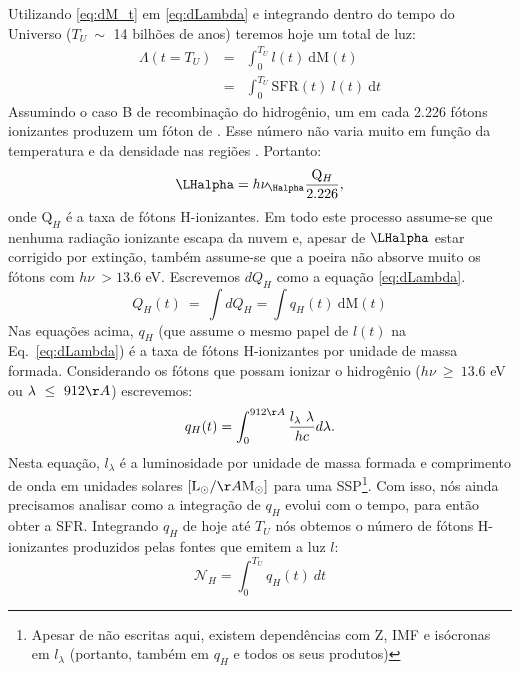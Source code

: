 Utilizando \eqref{eq:dM_t} em \eqref{eq:dLambda} e integrando dentro do tempo do Universo ($T_U\
\sim$ 14 bilhões de anos) teremos hoje um total de luz:
\begin{eqnarray}
	\Lambda(t = T_U) &=& \int_0^{T_U} l(t)\ \textrm{d}\textrm{M}(t) \\
	&=& \int_0^{T_U} \mathrm{SFR}(t)\ l(t)\ \textrm{d}t
	\label{eq:Lambda}
\end{eqnarray}
\noindent Assumindo o caso B de recombinação do hidrogênio, um em cada 2.226 fótons
ionizantes produzem um fóton de \Halpha \citep{Osterbrock.Ferland.2006a}. Esse número não varia
muito em função da temperatura e da densidade nas regiões \Hii. Portanto:
\begin{equation}
	\LHalpha = h \nu_{\Halpha} \frac{\mathrm{Q}_H}{2.226},
	\label{eq:LHa_recomb_theory}
\end{equation}
\noindent onde $\mathrm{Q}_H$ é a taxa de fótons H-ionizantes. Em todo este processo assume-se que
nenhuma radiação ionizante escapa da nuvem e, apesar de $\LHalpha$ estar corrigido por
extinção, também assume-se que a poeira não absorve muito os fótons com $h\nu\ > 13.6$ eV.
Escrevemos $dQ_H$ como a equação \eqref{eq:dLambda}.
\begin{equation}
	Q_H(t)\ =\ \int dQ_H = \int q_H(t)\ \mathrm{d}\mathrm{M}(t)
	\label{eq:QH_t}
\end{equation}
\noindent Nas equações acima, $q_H$ (que assume o mesmo papel de $l(t)$ na Eq.\ \ref{eq:dLambda}) é
a taxa de fótons H-ionizantes por unidade de massa formada. Considerando os fótons que possam ionizar
o hidrogênio ($h\nu\ \geq\ 13.6$ eV ou $\lambda\ \leq\ 912\AA$) escrevemos:
\begin{equation}
	q_H(t) = \int_0^{912\AA} \frac{l_\lambda\ \lambda}{h c} d\lambda.
	\label{eq:qH}
\end{equation}
\noindent Nesta equação, $l_\lambda$ é a luminosidade por unidade de massa formada e comprimento de
onda em unidades solares $[\textrm{L}_\odot/\AA\textrm{M}_\odot]$ para uma SSP\footnote{Apesar de
não escritas aqui, existem dependências com Z, IMF e isócronas em $l_\lambda$ (portanto, também em
$q_H$ e todos os seus produtos)}. Com isso, nós ainda precisamos analisar como a integração de
$q_H$ evolui com o tempo, para então obter a SFR. Integrando $q_H$ de hoje até $T_U$ nós
obtemos o número de fótons H-ionizantes produzidos pelas fontes que emitem a luz $l$:
\begin{equation}
	\mathcal{N}_H = \int_0^{T_U} q_H(t)\ dt
	\label{eq:Nh}
\end{equation}

